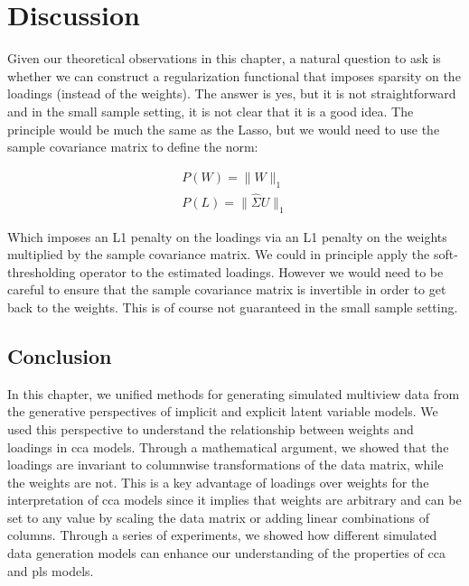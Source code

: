 \section{Discussion}




Given our theoretical observations in this chapter, a natural question to ask is whether we can construct a regularization functional that imposes sparsity on the \gls{loadings} (instead of the weights).
The answer is yes, but it is not straightforward and in the small sample setting, it is not clear that it is a good idea.
The principle would be much the same as the Lasso, but we would need to use the sample covariance matrix to define the norm:

\begin{align}
    P(W)=\|W\|_1 \\
    P(L)=\|\hat{\Sigma}U\|_1
\end{align}

Which imposes an L1 penalty on the \gls{loadings} via an L1 penalty on the \gls{weights} multiplied by the sample covariance matrix.
We could in principle apply the soft-thresholding operator to the estimated loadings.
However we would need to be careful to ensure that the sample covariance matrix is invertible in order to get back to the weights.
This is of course not guaranteed in the small sample setting.

\subsection{Conclusion}

In this chapter, we unified methods for generating simulated multiview data from the generative perspectives of implicit and explicit latent variable models.
We used this perspective to understand the relationship between weights and loadings in \acrshort{cca} models.
Through a mathematical argument, we showed that the \gls{loadings} are invariant to columnwise transformations of the data matrix, while the weights are not.
This is a key advantage of \gls{loadings} over weights for the interpretation of \acrshort{cca} models since it implies that weights are arbitrary and can be set to any value by scaling the data matrix or adding linear combinations of columns.
Through a series of experiments, we showed how different simulated data generation models can enhance our understanding of the properties of \acrshort{cca} and \acrshort{pls} models.